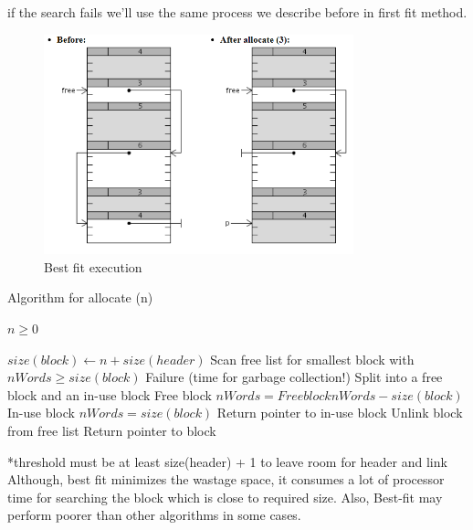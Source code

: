 if the search fails we'll use the same process we describe before in first fit method.

\begin{figure}[htbp]
    \begin{center}
        \includegraphics[width=0.8\textwidth]{figures/BF_alg}
    \caption{Best fit execution }
    \label{bf_alg}
    \end{center}
\end{figure}
\begin{algorithm}
\caption{Algorithm for allocate (n)}
\begin{algorithmic} 
\REQUIRE $n \geq 0$

\STATE $size(block) \leftarrow n + size(header)$ 
\STATE Scan free list for smallest block with $ nWords \geq size(block)$ 
  \STATE  Failure (time for garbage collection!) 
   \STATE Split into a free block and an in-use block 
   \STATE Free block  $nWords = Free block nWords - size(block) $
   \STATE In-use block $nWords = size(block) $
   \STATE Return pointer to in-use block 
\ELSE 
   \STATE Unlink block from free list 
   \STATE Return pointer to block 
\ENDIF

\end{algorithmic}
\end{algorithm}

*threshold must be at least size(header) + 1 to leave room for header and link \\


Although, best fit minimizes the wastage space, it consumes a lot of processor time for searching the block which is close to required size. Also, Best-fit may perform poorer than other algorithms in some cases.
 
